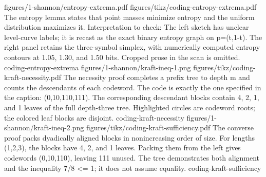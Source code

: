 {figures/1-shannon/entropy-extrema.pdf}
{figures/tikz/coding-entropy-extrema.pdf}
{The entropy lemma states that point masses minimize entropy and the uniform distribution maximizes it.}
{Interpretation to check: The left sketch has unclear level-curve labels; it is recast as the exact binary entropy graph on p=(t,1-t). The right panel retains the three-symbol simplex, with numerically computed entropy contours at 1.05, 1.30, and 1.50 bits. Cropped prose in the scan is omitted.}
{coding-entropy-extrema}
{figures/1-shannon/kraft-ineq-1.png}
{figures/tikz/coding-kraft-necessity.pdf}
{The necessity proof completes a prefix tree to depth m and counts the descendants of each codeword.}
{The code is exactly the one specified in the caption: (0,10,110,111). The corresponding descendant blocks contain 4, 2, 1, and 1 leaves of the full depth-three tree. Highlighted circles are codeword roots; the colored leaf blocks are disjoint.}
{coding-kraft-necessity}
{figures/1-shannon/kraft-ineq-2.png}
{figures/tikz/coding-kraft-sufficiency.pdf}
{The converse proof packs dyadically aligned blocks in nonincreasing order of size.}
{For lengths (1,2,3), the blocks have 4, 2, and 1 leaves. Packing them from the left gives codewords (0,10,110), leaving 111 unused. The tree demonstrates both alignment and the inequality 7/8 <= 1; it does not assume equality.}
{coding-kraft-sufficiency}
